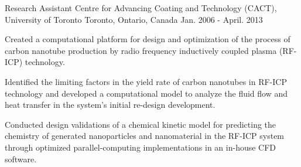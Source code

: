 \begin{cventries}

\cventry
{Research Assistant} %
{Centre for Advancing Coating and Technology (CACT), University of Toronto} %
{Toronto, Ontario, Canada} %
{Jan. 2006 - April. 2013} %
{ %
\begin{cvitems}
\item {Created a computational platform for design and optimization of the process of carbon nanotube
production by radio frequency inductively coupled plasma (RF-ICP) technology.}
\item {Identified the limiting factors in the yield rate of carbon nanotubes in RF-ICP technology and
developed a computational model to analyze the fluid flow and heat transfer in the system's initial re-design development.}
\item{Conducted design validations of a chemical kinetic model for predicting the chemistry of generated nanoparticles and nanomaterial in the RF-ICP system through optimized parallel-computing
implementations in an in-house CFD software.}
\end{cvitems} 
}






\end{cventries}
